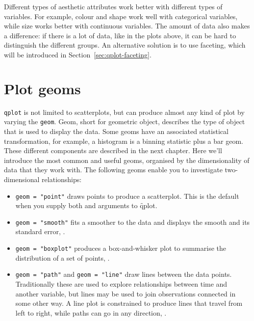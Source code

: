 % 


Different types of aesthetic attributes work better with different types of variables. For example, colour and shape work well with categorical variables, while size works better with continuous variables. The amount of data also makes a difference: if there is a lot of data, like in the plots above, it can be hard to distinguish the different groups. An alternative solution is to use faceting, which will be introduced in Section~\ref{sec:qplot-faceting}.

\section{Plot geoms}\label{sec:plot_geoms}

{\tt qplot} is not limited to scatterplots, but can produce almost any kind of plot by varying the {\tt geom}. Geom, short for geometric object, describes the type of object that is used to display the data. Some geoms have an associated statistical transformation, for example, a histogram is a binning statistic plus a bar geom. These different components are described in the next chapter. Here we'll introduce the most common and useful geoms, organised by the dimensionality of data that they work with. The following geoms enable you to investigate two-dimensional relationships:

\begin{itemize}

  \item {\tt geom = "point"} draws points to produce a scatterplot. This is the default when you supply both  and  arguments to \f{qplot}.

  \item {\tt geom = "smooth"} fits a smoother to the data and displays the smooth and its standard error, .

  \item {\tt geom = "boxplot"} produces a box-and-whisker plot to summarise the distribution of a set of points, .

  \item {\tt geom = "path"} and {\tt geom = "line"} draw lines between the data points.  Traditionally these are used to explore relationships between time and another variable, but lines may be used to join observations connected in some other way.  A line plot is constrained to produce lines that travel from left to right, while paths can go in any direction,  .
\end{itemize}

